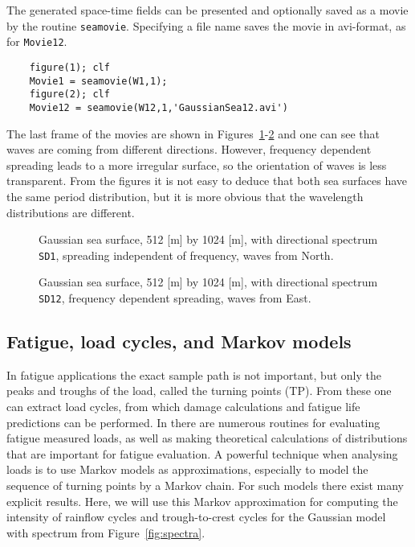 The generated space-time fields can be presented and optionally 
saved as a movie by the routine \verb+seamovie+. 
Specifying a file name saves the movie in avi-format, as for {\tt Movie12}.  
{\small\begin{verbatim}
    figure(1); clf
    Movie1 = seamovie(W1,1);
    figure(2); clf
    Movie12 = seamovie(W12,1,'GaussianSea12.avi')
\end{verbatim}

The last frame of the movies are shown in 
Figures~\ref{fig:00sima}-\ref{fig:00simb} and one can see that
waves are coming from different directions. However,
frequency dependent spreading leads to a more irregular
surface, so the orientation of waves is less transparent.
From the figures it is not easy to deduce that
both sea surfaces have the same period distribution, but
it is more obvious that the wavelength distributions are different.

\begin{figure}
  \centerline{
}
\vspace{-3mm}
\caption[Gaussian sea surface, frequency independent spreading]{Gaussian 
sea surface, 512 [m] by 1024 [m], with 
directional spectrum {\tt SD1}, spreading independent of frequency, waves from North.}
\label{fig:00sima}
\end{figure}
\begin{figure}
\centerline{
}
\vspace{-3mm}
\caption[Gaussian sea surface, frequency dependent spreading]{Gaussian 
sea surface, 512 [m] by 1024 [m], with 
directional spectrum {\tt SD12}, frequency dependent spreading, waves from East.}
\label{fig:00simb}
\end{figure}

\subsection{Fatigue, load cycles, and Markov models}%
In fatigue applications the exact sample path is not important, but
only the peaks and troughs of the load, called the  turning
points (TP). From these one can extract load cycles, from
which damage calculations and fatigue life predictions can be
performed. In \progname{}
there are numerous routines for evaluating fatigue measured loads, as
well as making theoretical calculations of distributions that are
important for fatigue evaluation.  A powerful technique when
analysing loads is to use Markov models as approximations, especially
to model the sequence of turning points by a Markov chain. For such
models there
exist many explicit results. Here, we will use this Markov
approximation for computing the intensity of rainflow cycles and
trough-to-crest cycles for the Gaussian model with spectrum from
Figure~\ref{fig:spectra}.

}

